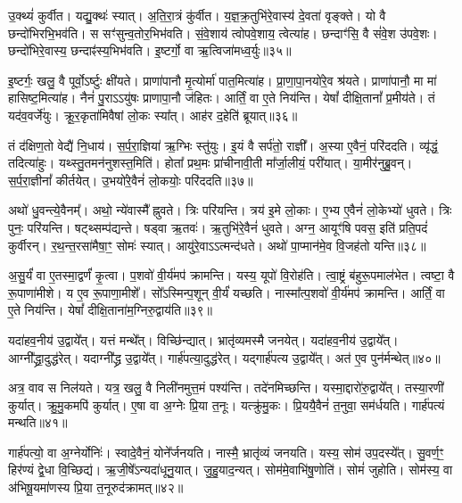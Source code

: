 उ॒क्थ्यं॑ कुर्वीत।
यद्यु॒क्थः॑ स्यात्।
अ॒ति॒रा॒त्रं कु॑र्वीत।
य॒ज्ञ॒क्र॒तुभि॑रे॒वास्य॑ दे॒वता॑ वृङ्क्ते।
यो वै छन्दो॑भिरभि॒भव॑ति।
स सꣳ॑सुन्व॒तोर॒भिभ॑वति।
सं॒वे॒शाय॑ त्वोपवे॒शाय॒ त्वेत्या॑ह।
छन्दाꣳ॑सि॒ वै सं॑वे॒श उ॑पवे॒शः।
छन्दो॑भिरे॒वास्य॒ छन्दाꣴ॑स्य॒भिभ॑वति।
इ॒ष्टर्गो॒ वा ऋ॒त्विजा॑मध्व॒र्युः॥३५॥

इ॒ष्टर्गः॒ खलु॒ वै पूर्वो॒\-ऽर्ष्टुः क्षी॑यते।
प्राणा॑पानौ मृ॒त्योर्मा॑ पात॒मित्या॑ह।
प्रा॒णा॒पा॒नयो॑रे॒व श्र॑यते।
प्राणा॑पानौ॒ मा मा॑ हासिष्ट॒मित्या॑ह।
नैनं॑ पु॒रा\-ऽऽयु॑षः प्राणापा॒नौ ज॑हितः।
आर्तिं॒ वा ए॒ते निय॑न्ति।
येषां᳚ दीक्षि॒तानां᳚ प्र॒मीय॑ते।
तं यद॑व॒वर्जे॑युः।
क्रू॒र॒कृता॑मिवैषां लो॒कः स्या᳚त्।
आह॑र द॒हेति॑ ब्रूयात्॥३६॥

तं द॑क्षिण॒तो वेद्यै॑ नि॒धाय॑।
स॒र्प॒रा॒ज्ञिया॑ ऋ॒ग्भिः स्तु॑युः।
इ॒यं वै सर्प॑तो॒ राज्ञी᳚।
अ॒स्या ए॒वैनं॒ परि॑ददति।
व्यृ॑द्धं॒ तदित्या॑हुः।
यथ्स्तु॒तमन॑नुशस्त॒मिति॑।
होता᳚ प्रथ॒मः प्रा॑चीनावी॒ती मा᳚र्जा॒लीयं॒ परी॑यात्।
या॒मीर॑नुब्रु॒वन्।
स॒र्प॒रा॒ज्ञीनां᳚ कीर्तयेत्।
उ॒भयो॑रे॒वैनं॑ लो॒कयोः॒ परि॑ददति॥३७॥

अथो॑ धु॒वन्त्ये॒वैनम्᳚।
अथो॒ न्ये॑वास्मै᳚ ह्नुवते।
त्रिः परि॑यन्ति।
त्रय॑ इ॒मे लो॒काः।
ए॒भ्य ए॒वैनं॑ लो॒केभ्यो॑ धुवते।
त्रिः पुनः॒ परि॑यन्ति।
षट्थ्सम्प॑द्यन्ते।
षड्वा ऋ॒तवः॑।
ऋ॒तुभि॑रे॒वैनं॑ धुवते।
अग्न॒ आयूꣳ॑षि पवस॒ इति॑ प्रति॒पदं॑ कुर्वीरन्।
र॒थ॒न्त॒रसा॑मैषा॒ꣳ॒ सोमः॑ स्यात्।
आयु॑रे॒वाऽऽत्मन्द॑धते।
अथो॑ पा॒प्मान॑मे॒व वि॒जह॑तो यन्ति॥३८॥\anuvakamend[अ॒भिजि॑त्यै पृथि॒व्याश्च॒ स्याद॑ध्व॒र्युर्ब्रू॑याल्लो॒कयोः॒ परि॑ददति कुर्वीर॒ꣴ॒स्त्रीणि॑ च]

अ॒सु॒र्यं॑ वा ए॒तस्मा॒द्वर्णं॑ कृ॒त्वा।
प॒शवो॑ वी॒र्य॑मप॑ क्रामन्ति।
यस्य॒ यूपो॑ वि॒रोह॑ति।
त्वा॒ष्ट्रं ब॑हुरू॒पमाल॑भेत।
त्वष्टा॒ वै रू॒पाणा॑मीशे।
य ए॒व रू॒पाणा॒मीशे᳚।
सो᳚ऽस्मिन्प॒शून् वी॒र्यं॑ यच्छति।
नास्मा᳚त्प॒शवो॑ वी॒र्य॑मप॑ क्रामन्ति।
आर्तिं॒ वा ए॒ते निय॑न्ति।
येषां᳚ दीक्षि॒ताना॑म॒ग्निरु॒द्वाय॑ति॥३९॥

यदा॑हव॒नीय॑ उ॒द्वाये᳚त्।
यत्तं मन्थे᳚त्।
वि\-च्छि॑न्द्यात्।
भ्रातृ॑व्यमस्मै जनयेत्।
यदा॑हव॒नीय॑ उ॒द्वाये᳚त्।
आग्नी᳚द्ध्रा॒दुद्ध॑\-रेत्।
यदाग्नी᳚द्ध्र उ॒द्वाये᳚त्।
गार्\mbox{}ह॑पत्या॒दुद्ध॑रेत्।
यद्गार्\mbox{}ह॑पत्य उ॒द्वाये᳚त्।
अत॑ ए॒व पुन॑र्मन्थेत्॥४०॥

अत्र॒ वाव स निल॑यते।
यत्र॒ खलु॒ वै निली॑नमुत्त॒मं पश्य॑न्ति।
तदे॑नमिच्छन्ति।
यस्मा॒द्दारो॑रु॒द्वाये᳚त्।
तस्या॒रणी॑ कुर्यात्।
क्रु॒मु॒कमपि॑ कुर्यात्।
ए॒षा वा अ॒ग्नेः प्रि॒या त॒नूः।
यत्क्रु॑मु॒कः।
प्रि॒ययै॒वैनं॑ त॒नुवा॒ सम॑र्धयति।
गार्\mbox{}ह॑पत्यं मन्थति॥४१॥

गार्\mbox{}ह॑पत्यो॒ वा अ॒ग्नेर्योनिः॑।
स्वादे॒वैनं॒ योने᳚र्जनयति।
नास्मै॒ भ्रातृ॑व्यं जनयति।
यस्य॒ सोम॑ उप॒दस्ये᳚त्।
सु॒वर्ण॒ꣳ॒ हिर॑ण्यं द्वे॒धा वि॒च्छिद्य॑।
ऋ॒जी॒षे᳚\-ऽन्यदा॑धूनु॒यात्।
जु॒हु॒याद॒न्यत्।
सोम॑मे॒वाभि॑षु॒णोति॑।
सोमं॑ जुहोति।
सोम॑स्य॒ वा अ॑भिषू॒यमा॑णस्य प्रि॒या त॒नूरुद॑क्रामत्॥४२॥

